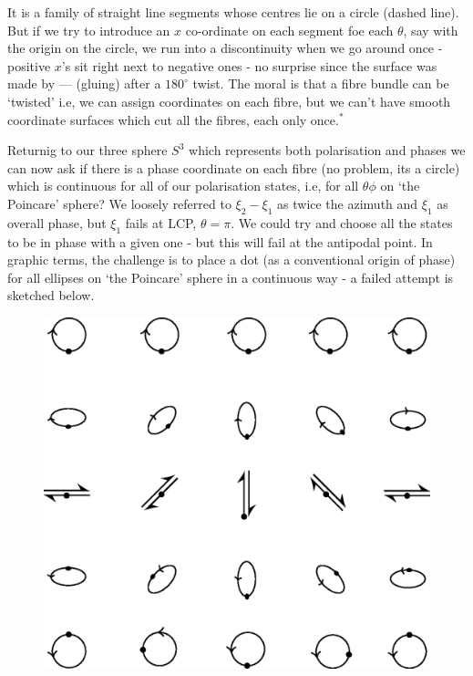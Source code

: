 It is a family of straight line segments whose centres lie on a circle (dashed
line). But if we try to introduce an $x$ co-ordinate on each segment foe each $\theta$,
say with the origin on the circle, we run into a discontinuity when we go around
once - positive $x$'s sit right next to negative ones - no surprise since the surface
was made by --- (gluing) after a $180^{\circ}$ twist. The moral is that a fibre bundle can
be `twisted' i.e, we can assign coordinates on each fibre, but we can't have smooth
coordinate surfaces which cut all the fibres, each only once.$^{\ast}$

Returnig to our three sphere $S^3$ which represents both polarisation and
phases we can now ask if there is a phase coordinate on each fibre (no problem,
its a circle) which is continuous for all of our polarisation states, i.e, for all $\theta \phi$
on `the Poincare' sphere? We loosely referred to $\xi_2 - \xi_1$ as twice the azimuth and
$\xi_1$ as overall phase, but $\xi_1$ fails at LCP, $\theta = \pi$. We could try and choose all the
states to be in phase with a given one - but this will fail at the antipodal point.
In graphic terms, the challenge is to place a dot (as a conventional origin of phase)
for all ellipses on `the Poincare' sphere in a continuous way - a failed attempt is
sketched below.
\begin{figure}[H]
\centering
\includegraphics[scale=0.22]{src/images/chap26/18.jpg}
\end{figure}

